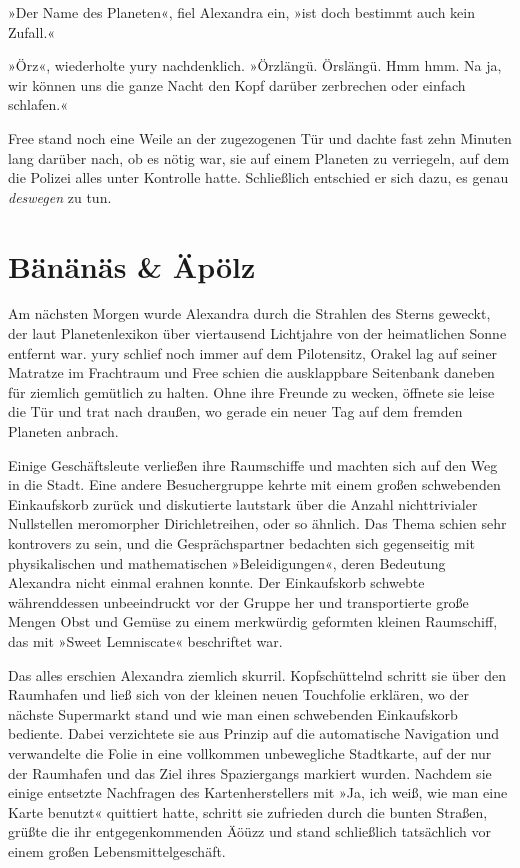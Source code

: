 »Der Name des Planeten«, fiel Alexandra ein, »ist doch bestimmt auch kein Zufall.«

»Örz«, wiederholte yury nachdenklich. »Örzlängü. Örslängü. Hmm hmm. Na ja, wir können uns die ganze Nacht den Kopf darüber zerbrechen oder einfach schlafen.«

Free stand noch eine Weile an der zugezogenen Tür und dachte fast zehn Minuten lang darüber nach, ob es nötig war, sie auf einem Planeten zu verriegeln, auf dem die Polizei alles unter Kontrolle hatte. Schließlich entschied er sich dazu, es genau \textit{deswegen} zu tun.

\cleardoubleevenpage



\chapter{Bänänäs \& Äpölz}

Am nächsten Morgen wurde Alexandra durch die Strahlen des Sterns geweckt, der laut Planetenlexikon über viertausend Lichtjahre von der heimatlichen Sonne entfernt war. yury schlief noch immer auf dem Pilotensitz, Orakel lag auf seiner Matratze im Frachtraum und Free schien die ausklappbare Seitenbank daneben für ziemlich gemütlich zu halten. Ohne ihre Freunde zu wecken, öffnete sie leise die Tür und trat nach draußen, wo gerade ein neuer Tag auf dem fremden Planeten anbrach.

Einige Geschäftsleute verließen ihre Raumschiffe und machten sich auf den Weg in die Stadt. Eine andere Besuchergruppe kehrte mit einem großen schwebenden Einkaufskorb zurück und diskutierte lautstark über die Anzahl nichttrivialer Nullstellen meromorpher Dirichletreihen, oder so ähnlich. Das Thema schien sehr kontrovers zu sein, und die Gesprächspartner bedachten sich gegenseitig mit physikalischen und mathematischen »Beleidigungen«, deren Bedeutung Alexandra nicht einmal erahnen konnte. Der Einkaufskorb schwebte währenddessen unbeeindruckt vor der Gruppe her und transportierte große Mengen Obst und Gemüse zu einem merkwürdig geformten kleinen Raumschiff, das mit »Sweet Lemniscate« beschriftet war.

Das alles erschien Alexandra ziemlich skurril. Kopfschüttelnd schritt sie über den Raumhafen und ließ sich von der kleinen neuen Touchfolie erklären, wo der nächste Supermarkt stand und wie man einen schwebenden Einkaufskorb bediente. Dabei verzichtete sie aus Prinzip auf die automatische Navigation und verwandelte die Folie in eine vollkommen unbewegliche Stadtkarte, auf der nur der Raumhafen und das Ziel ihres Spaziergangs markiert wurden. Nachdem sie einige entsetzte Nachfragen des Kartenherstellers mit »Ja, ich weiß, wie man eine Karte benutzt« quittiert hatte, schritt sie zufrieden durch die bunten Straßen, grüßte die ihr entgegenkommenden Äöüzz und stand schließlich tatsächlich vor einem großen Lebensmittelgeschäft.

